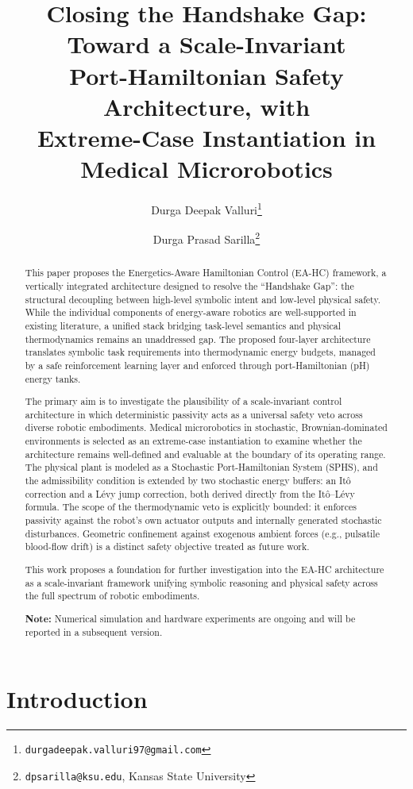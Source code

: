 \documentclass[11pt]{article}
\title{Closing the Handshake Gap: Toward a Scale-Invariant\\
Port-Hamiltonian Safety Architecture, with\\
Extreme-Case Instantiation in Medical Microrobotics}
\author{Durga Deepak Valluri\thanks{\texttt{durgadeepak.valluri97@gmail.com}}
\and
Durga Prasad Sarilla\thanks{\texttt{dpsarilla@ksu.edu}, Kansas State University}}
\date{}
\begin{document}
\maketitle

\begin{abstract}
This paper proposes the Energetics-Aware Hamiltonian Control (EA-HC) framework, a
vertically integrated architecture designed to resolve the ``Handshake Gap'': the structural
decoupling between high-level symbolic intent and low-level physical safety. While the
individual components of energy-aware robotics are well-supported in existing literature,
a unified stack bridging task-level semantics and physical thermodynamics remains an
unaddressed gap. The proposed four-layer architecture translates symbolic task requirements
into thermodynamic energy budgets, managed by a safe reinforcement learning layer and
enforced through port-Hamiltonian (pH) energy tanks.

The primary aim is to investigate the plausibility of a scale-invariant control architecture
in which deterministic passivity acts as a universal safety veto across diverse robotic embodiments. Medical microrobotics in stochastic, Brownian-dominated environments is selected
as an extreme-case instantiation to examine whether the architecture remains well-defined
and evaluable at the boundary of its operating range. The physical plant is modeled as a
Stochastic Port-Hamiltonian System (SPHS), and the admissibility condition is extended by
two stochastic energy buffers: an It\^{o} correction and a L\'{e}vy jump correction, both derived
directly from the It\^{o}--L\'{e}vy formula. The scope of the thermodynamic veto is explicitly
bounded: it enforces passivity against the robot's own actuator outputs and internally
generated stochastic disturbances. Geometric confinement against exogenous ambient forces
(e.g., pulsatile blood-flow drift) is a distinct safety objective treated as future work.

This work proposes a foundation for further investigation into the EA-HC architecture as
a scale-invariant framework unifying symbolic reasoning and physical safety across the full
spectrum of robotic embodiments.

\smallskip
\noindent\textbf{Note:} Numerical simulation and hardware experiments are ongoing and will be reported in a subsequent version.
\end{abstract}

\tableofcontents
\newpage

\section{Introduction}
\end{document}
